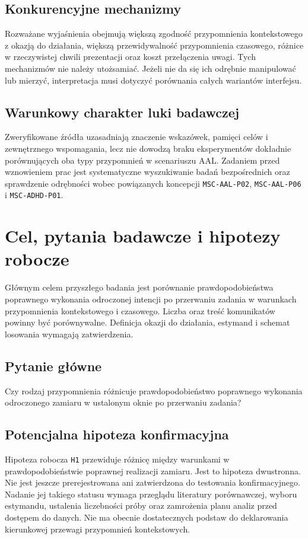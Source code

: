 \documentclass[11pt,a4paper]{article}
\begin{document}
\subsection{Konkurencyjne mechanizmy}
Rozważane wyjaśnienia obejmują większą zgodność przypomnienia kontekstowego z okazją do działania, większą przewidywalność przypomnienia czasowego, różnice w rzeczywistej chwili prezentacji oraz koszt przełączenia uwagi. Tych mechanizmów nie należy utożsamiać. Jeżeli nie da się ich odrębnie manipulować lub mierzyć, interpretacja musi dotyczyć porównania całych wariantów interfejsu.

\subsection{Warunkowy charakter luki badawczej}
Zweryfikowane źródła uzasadniają znaczenie wskazówek, pamięci celów i zewnętrznego wspomagania, lecz nie dowodzą braku eksperymentów dokładnie porównujących oba typy przypomnień w scenariuszu AAL. Zadaniem przed wznowieniem prac jest systematyczne wyszukiwanie badań bezpośrednich oraz sprawdzenie odrębności wobec powiązanych koncepcji \texttt{MSC-AAL-P02}, \texttt{MSC-AAL-P06} i \texttt{MSC-ADHD-P01}.

\section{Cel, pytania badawcze i hipotezy robocze}
Głównym celem przyszłego badania jest porównanie prawdopodobieństwa poprawnego wykonania odroczonej intencji po przerwaniu zadania w warunkach przypomnienia kontekstowego i czasowego. Liczba oraz treść komunikatów powinny być porównywalne. Definicja okazji do działania, estymand i schemat losowania wymagają zatwierdzenia.

\subsection{Pytanie główne}
Czy rodzaj przypomnienia różnicuje prawdopodobieństwo poprawnego wykonania odroczonego zamiaru w ustalonym oknie po przerwaniu zadania?

\subsection{Potencjalna hipoteza konfirmacyjna}
Hipoteza robocza \texttt{H1} przewiduje różnicę między warunkami w prawdopodobieństwie poprawnej realizacji zamiaru. Jest to hipoteza dwustronna. Nie jest jeszcze prerejestrowana ani zatwierdzona do testowania konfirmacyjnego. Nadanie jej takiego statusu wymaga przeglądu literatury porównawczej, wyboru estymandu, ustalenia liczebności próby oraz zamrożenia planu analiz przed dostępem do danych. Nie ma obecnie dostatecznych podstaw do deklarowania kierunkowej przewagi przypomnień kontekstowych.
\end{document}

